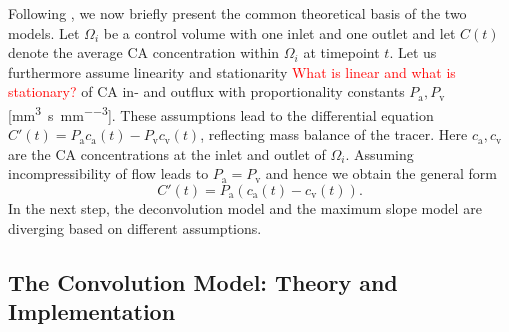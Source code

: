\documentclass[paper=a4, fontsize=11pt,parskip=half,headings=small]{scrartcl}
\newcommand{\ca}{c_\mathrm{a}}
\newcommand{\cout}{c_{\mathrm{v}}}
\newcommand{\Pa}{P_{\mathrm{a}}}
\newcommand{\Pout}{P_{\mathrm{v}}}
\newcommand{\siQmm}{\milli\meter\cubed\per\second\per\milli\meter\cubed}
\begin{document}
		
	Following \cite{sourbron13}, we now briefly present the common theoretical basis of the two models.
	Let $\Omega_i$ be a control volume with one inlet and one outlet and let $C(t)$ denote the average CA concentration within $\Omega_i$ at timepoint $t$.
	Let us furthermore assume linearity and stationarity \textcolor{red}{What is linear and what is stationary?} of CA in- and outflux with proportionality constants $\Pa, \Pout$  [\si{\siQmm}].
	These assumptions lead to the differential equation $C'(t) = \Pa\ca(t) - \Pout\cout(t)$, reflecting mass balance of the tracer. 
	Here $\ca,\cout$ are the CA concentrations at the inlet and outlet of $\Omega_i$.
	Assuming incompressibility of flow leads to $\Pa = \Pout$ and hence we obtain the general form
	\begin{equation}
		C'(t) = \Pa\left(\ca(t) - \cout(t)\right).
		\label{eq:classicgeneral}
	\end{equation}
	In the next step, the deconvolution model and the maximum slope model are diverging based on different assumptions.

	\subsection{The Convolution Model: Theory and Implementation}\label{sec:conv}
	
\end{document}
